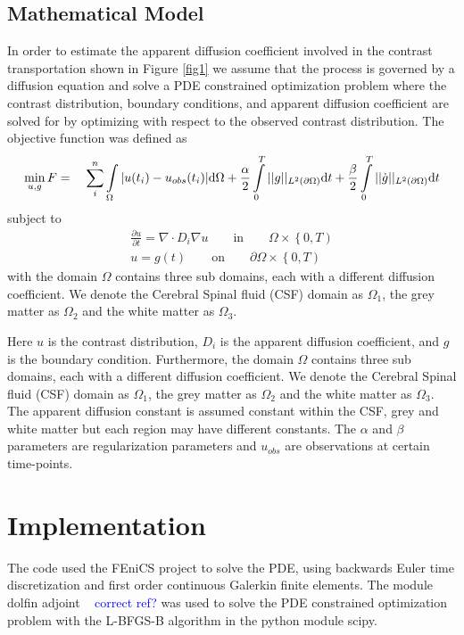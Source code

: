 \documentclass[11pt,a4paper]{article}
\newcommand{\kam}[1]{\textcolor{blue}{#1}}
\begin{document}
\subsection*{Mathematical Model}
In order to estimate the apparent diffusion coefficient involved in the contrast transportation shown 
in Figure \ref{fig1} we assume that the process is governed by a diffusion equation and  
solve a PDE constrained optimization problem where
the contrast distribution, boundary conditions, and apparent
diffusion coefficient are solved for by optimizing with
respect to the observed contrast distribution. 
The objective function was defined as 
\begin{equation}
\min_{u,g} F = \quad \sum\limits_i\sp{n} \int\limits_{\Omega} |u(t_i) - u_{obs}(t_i)| \mathrm{d}\Omega + \frac{\alpha}{2} \int\limits_{0}\sp{T} || g ||_{L\sp{2}(\partial\Omega)} \mathrm{d}t + \frac{\beta}{2} \int\limits_{0}\sp{T} || \dot{g} ||_{L\sp{2}(\partial\Omega)}\mathrm{d}t 
\label{EQ::objf}
\end{equation}
subject to   
\begin{equation}
\begin{aligned}
\frac{\partial u}{\partial t} = \nabla \cdot  D_i \nabla u \qquad \text{in} \qquad \Omega \times \left\lbrace 0 , T \right)  \\
u=g(t) \qquad \text{on} \qquad \partial\Omega  \times \left\lbrace 0 , T \right) 
\end{aligned}
\label{Eq::PDE}
\end{equation}
with the domain $\Omega$ contains three sub domains, each with a different diffusion coefficient. We denote the Cerebral Spinal fluid (CSF) domain as $\Omega_1$, the grey matter as $\Omega_2$ and the white matter as $\Omega_3$.

Here $u$ is the contrast distribution, $D_i$ is the apparent diffusion 
coefficient, and $g$ is the boundary condition. Furthermore,  
the domain $\Omega$ contains three sub domains, each with a different diffusion coefficient. We denote the Cerebral Spinal fluid (CSF) domain as $\Omega_1$, the grey matter as $\Omega_2$ and the white matter as $\Omega_3$. The apparent
diffusion constant is assumed constant within the CSF, grey and 
white matter but each region may have different constants.  
The $\alpha$ and $\beta$ parameters are regularization parameters 
and $u_{obs}$ are observations at certain time-points. 

\section*{Implementation}
The code used the FEniCS project to solve the PDE, using backwards Euler time discretization and first order continuous Galerkin finite elements. The module dolfin adjoint ~\cite{farrell2013automated} \kam{correct ref?} was used to solve the PDE constrained optimization problem with the L-BFGS-B algorithm in the python module scipy.   
\end{document}
